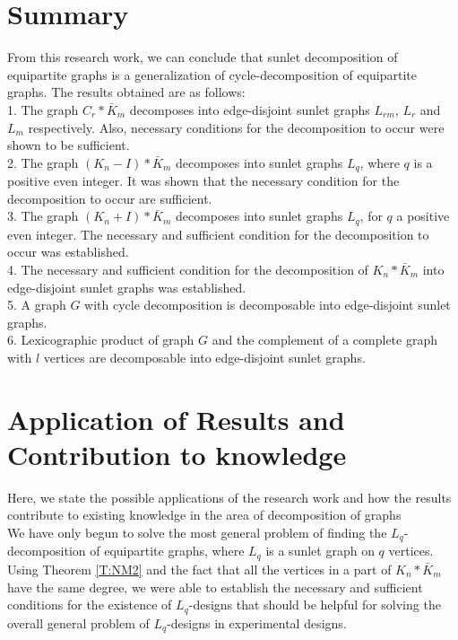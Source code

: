 \documentclass[12pt]{report}
\begin{document}
\section{Summary}
From this research work, we can conclude that sunlet decomposition
of equipartite graphs is a generalization of cycle-decomposition of
equipartite graphs. The results obtained are as follows:\\
1. The graph $C_r*\bar{K}_m$ decomposes into edge-disjoint sunlet graphs $L_{rm}$,  $L_r$ and $L_m$
respectively. Also, necessary conditions for the decomposition to occur were shown to be sufficient.\\
2. The graph $(K_n-I)*\bar{K}_m$ decomposes into sunlet graphs $L_q$, where $q$ is a positive even integer. It was shown that the necessary condition for the decomposition to occur are sufficient.\\
3. The graph $(K_n+I)*\bar{K}_m$ decomposes into sunlet graphs $L_q$, for $q$  a positive even integer. The necessary and sufficient condition for the decomposition to occur was established.\\
4. The necessary and sufficient condition for the decomposition of $K_n*\bar{K}_m$ into edge-disjoint sunlet graphs was established.\\
5. A graph $G$ with cycle decomposition is decomposable into edge-disjoint sunlet graphs.\\
6. Lexicographic product of graph $G$ and the complement of a complete graph with $l$ vertices are decomposable into edge-disjoint sunlet graphs.
\section{Application of Results and Contribution to knowledge}
Here, we state the possible applications of the research work and how the results contribute to existing knowledge in the area of decomposition of graphs \\
We have only begun to %
solve the most general problem of finding the $L_q$-decomposition of equipartite graphs, where $L_q$ is a sunlet graph on $q$ vertices. Using Theorem \ref{T:NM2} and the fact that all the vertices in a part of $K_n*\bar{K}_m$ have the same degree, we were able to establish the necessary and sufficient conditions for the existence of $L_q$-designs that should be helpful for solving the overall general problem of $L_q$-designs in experimental designs.
\end{document}
